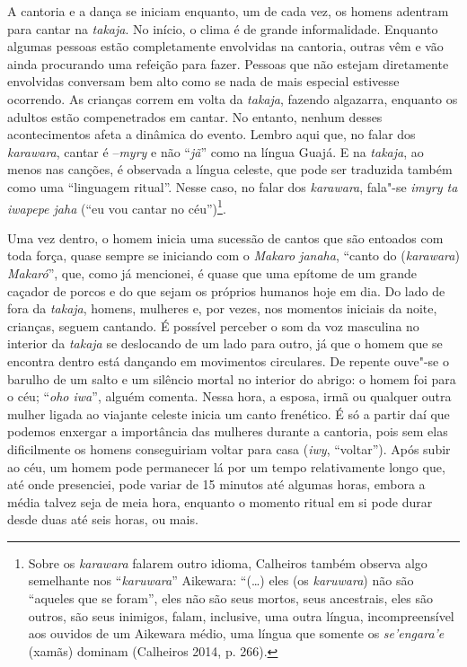 A cantoria e a dança se iniciam enquanto, um de cada vez, os homens
adentram para cantar na \emph{takaja}. No início, o clima é de grande
informalidade. Enquanto algumas pessoas estão completamente envolvidas
na cantoria, outras vêm e vão ainda procurando uma refeição para fazer.
Pessoas que não estejam diretamente envolvidas conversam bem alto como
se nada de mais especial estivesse ocorrendo. As crianças correm em
volta da \emph{takaja}, fazendo algazarra, enquanto os adultos estão
compenetrados em cantar. No entanto, nenhum desses acontecimentos afeta
a dinâmica do evento. Lembro aqui que, no falar dos \emph{karawara},
cantar é --\emph{myry} e não ``\emph{jã}'' como na língua Guajá. E na
\emph{takaja}, ao menos nas canções, é observada a língua celeste, que
pode ser traduzida também como uma ``linguagem ritual''. Nesse caso, no
falar dos \emph{karawara}, fala"-se \emph{imyry ta iwapepe jaha} (``eu
vou cantar no céu'')\footnote{Sobre os \emph{karawara} falarem outro
  idioma, Calheiros também observa algo semelhante nos
  ``\emph{karuwara}'' Aikewara: ``(\ldots{}) eles (os \emph{karuwara}) não
  são ``aqueles que se foram'', eles não são seus mortos, seus
  ancestrais, eles são outros, são seus inimigos, falam, inclusive, uma
  outra língua, incompreensível aos ouvidos de um Aikewara médio, uma
  língua que somente os \emph{se'engara'e} (xamãs) dominam (Calheiros
  2014, p. 266).}.

Uma vez dentro, o homem inicia uma sucessão de cantos que são entoados
com toda força, quase sempre se iniciando com o \emph{Makaro janaha},
``canto do (\emph{karawara}) \emph{Makaró}'', que, como já mencionei, é
quase que uma epítome de um grande caçador de porcos e do que sejam os
próprios humanos hoje em dia. Do lado de fora da \emph{takaja}, homens,
mulheres e, por vezes, nos momentos iniciais da noite, crianças, seguem
cantando. É possível perceber o som da voz masculina no interior da
\emph{takaja} se deslocando de um lado para outro, já que o homem que se
encontra dentro está dançando em movimentos circulares. De repente
ouve"-se o barulho de um salto e um silêncio mortal no interior do
abrigo: o homem foi para o céu; ``\emph{oho iwa}'', alguém comenta.
Nessa hora, a esposa, irmã ou qualquer outra mulher ligada ao viajante
celeste inicia um canto frenético. É só a partir daí que podemos
enxergar a importância das mulheres durante a cantoria, pois sem elas
dificilmente os homens conseguiriam voltar para casa (\emph{iwy},
``voltar''). Após subir ao céu, um homem pode permanecer lá por um tempo
relativamente longo que, até onde presenciei, pode variar de 15 minutos
até algumas horas, embora a média talvez seja de meia hora, enquanto o
momento ritual em si pode durar desde duas até seis horas, ou mais.


